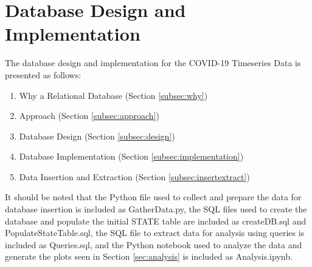 \documentclass[11pt]{article}
\begin{document}


\pagebreak

\section{Database Design and Implementation}
\label{sec:designimplementation}

\noindent
The database design and implementation for the COVID-19 Timeseries Data is presented as follows:

\begin{enumerate}[1)]
    \item Why a Relational Database (Section \ref{subsec:why})
    \item Approach (Section \ref{subsec:approach})
    \item Database Design (Section \ref{subsec:design})
    \item Database Implementation (Section \ref{subsec:implementation})
    \item Data Insertion and Extraction (Section \ref{subsec:insertextract})
\end{enumerate}

\noindent
It should be noted that the Python file used to collect and prepare the data for database insertion is included as GatherData.py, the SQL files used to create the database and populate the initial STATE table are included as createDB.sql and PopulateStateTable.sql, the SQL file to extract data for analysis using queries is included as Queries.sql, and the Python notebook used to analyze the data and generate the plots seen in Section \ref{sec:analysis} is included as Analysis.ipynb.
\end{document}
